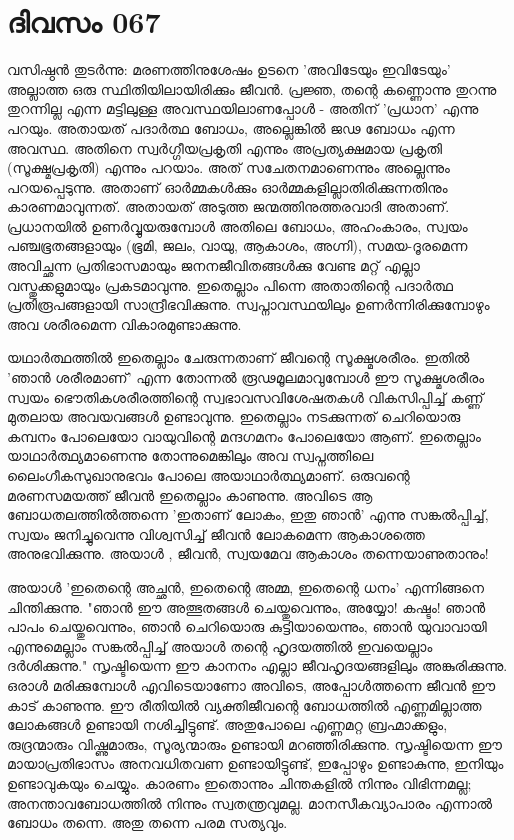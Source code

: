  
\section{ദിവസം 067}


വസിഷ്ഠന്‍ തുടര്‍ന്നു: മരണത്തിനുശേഷം  ഉടനെ 'അവിടേയും ഇവിടേയും' അല്ലാത്ത ഒരു സ്ഥിതിയിലായിരിക്കും ജീവൻ. പ്രജ്ഞ, തന്റെ കണ്ണൊന്നു തുറന്നു തുറന്നില്ല എന്ന മട്ടിലുള്ള അവസ്ഥയിലാണപ്പോള്‍ - അതിന്‌ 'പ്രധാന' എന്നു പറയും. അതായത്‌ പദാര്‍ത്ഥ ബോധം, അല്ലെങ്കിൽ ജഢ ബോധം എന്ന അവസ്ഥ. അതിനെ സ്വര്‍ഗ്ഗീയപ്രകൃതി എന്നും അപ്രത്യക്ഷമായ പ്രകൃതി (സൂക്ഷ്മപ്രകൃതി) എന്നും പറയാം. അത്‌ സചേതനമാണെന്നും അല്ലെന്നും പറയപ്പെടുന്നു. അതാണ്‌ ഓര്‍മ്മകള്‍ക്കും ഓര്‍മ്മകളില്ലാതിരിക്കുന്നതിനും കാരണമാവുന്നത്‌. അതായത്‌ അടുത്ത ജന്മത്തിനുത്തരവാദി അതാണ്‌. പ്രധാനയില്‍ ഉണര്‍വ്വുയരുമ്പോള്‍ അതിലെ ബോധം, അഹംകാരം, സ്വയം പഞ്ചഭൂതങ്ങളായും (ഭൂമി, ജലം, വായു, ആകാശം, അഗ്നി), സമയ-ദൂരമെന്ന അവിച്ഛന്ന പ്രതിഭാസമായും ജനനജീവിതങ്ങള്‍ക്കു വേണ്ട മറ്റ് എല്ലാ വസ്തുക്കളുമായും പ്രകടമാവുന്നു. ഇതെല്ലാം പിന്നെ അതാതിന്റെ പദാര്‍ത്ഥ പ്രതിരൂപങ്ങളായി സാന്ദ്രീഭവിക്കുന്നു. സ്വപ്നാവസ്ഥയിലും ഉണര്‍ന്നിരിക്കുമ്പോഴും അവ ശരീരമെന്ന വികാരമുണ്ടാക്കുന്നു.

യഥാര്‍ത്ഥത്തില്‍ ഇതെല്ലാം ചേരുന്നതാണ്‌ ജീവന്റെ സൂക്ഷ്മശരീരം. ഇതില്‍ 'ഞാന്‍ ശരീരമാണ്‌' എന്ന തോന്നല്‍ രൂഢമൂലമാവുമ്പോള്‍ ഈ സൂക്ഷ്മശരീരം സ്വയം ഭൌതികശരീരത്തിന്റെ സ്വഭാവസവിശേഷതകള്‍ വികസിപ്പിച്ച്‌ കണ്ണ്‌  മുതലായ അവയവങ്ങള്‍ ഉണ്ടാവുന്നു. ഇതെല്ലാം നടക്കുന്നത്‌ ചെറിയൊരു കമ്പനം പോലെയോ വായുവിന്റെ മന്ദഗമനം പോലെയോ ആണ്‌. ഇതെല്ലാം യാഥാര്‍ത്ഥ്യമാണെന്നു തോന്നുമെങ്കിലും അവ സ്വപ്നത്തിലെ ലൈംഗീകസുഖാനുഭവം പോലെ അയാഥാര്‍ത്ഥ്യമാണ്‌. ഒരുവന്റെ മരണസമയത്ത്‌ ജീവന്‍ ഇതെല്ലാം കാണുന്നു. അവിടെ ആ ബോധതലത്തില്‍ത്തന്നെ 'ഇതാണ്‌ ലോകം, ഇതു ഞാന്‍' എന്നു സങ്കല്‍പ്പിച്ച്‌, സ്വയം ജനിച്ചുവെന്നു വിശ്വസിച്ച്‌ ജീവന്‍ ലോകമെന്ന ആകാശത്തെ അനുഭവിക്കുന്നു. അയാള്‍ , ജീവന്‍, സ്വയമേവ ആകാശം തന്നെയാണുതാനും! 

അയാള്‍ 'ഇതെന്റെ അച്ഛന്‍, ഇതെന്റെ അമ്മ, ഇതെന്റെ ധനം' എന്നിങ്ങനെ ചിന്തിക്കുന്നു. "ഞാന്‍ ഈ അത്ഭുതങ്ങള്‍ ചെയ്തുവെന്നും, അയ്യോ! കഷ്ടം! ഞാന്‍ പാപം ചെയ്തുവെന്നും, ഞാന്‍ ചെറിയൊരു കുട്ടിയായെന്നും, ഞാന്‍ യുവാവായി എന്നുമെല്ലാം സങ്കല്‍പ്പിച്ച്‌ അയാള്‍ തന്റെ ഹൃദയത്തില്‍ ഇവയെല്ലാം ദര്‍ശിക്കുന്നു." സൃഷ്ടിയെന്ന ഈ കാനനം എല്ലാ ജീവഹൃദയങ്ങളിലും അങ്കുരിക്കുന്നു. ഒരാള്‍ മരിക്കുമ്പോള്‍ എവിടെയാണോ അവിടെ, അപ്പോള്‍ത്തന്നെ ജീവന്‍ ഈ കാട്‌ കാണുന്നു. ഈ രീതിയില്‍ വ്യക്തിജീവന്റെ ബോധത്തില്‍ എണ്ണമില്ലാത്ത ലോകങ്ങള്‍ ഉണ്ടായി നശിച്ചിട്ടുണ്ട്‌. അതുപോലെ എണ്ണമറ്റ ബ്രഹ്മാക്കളും, രുദ്രന്മാരും വിഷ്ണുമാരും, സൂര്യന്മാരും ഉണ്ടായി മറഞ്ഞിരിക്കുന്നു. സൃഷ്ടിയെന്ന ഈ മായാപ്രതിഭാസം അനവധിതവണ ഉണ്ടായിട്ടുണ്ട്‌, ഇപ്പോഴും ഉണ്ടാകുന്നു, ഇനിയും ഉണ്ടാവുകയും ചെയ്യും. കാരണം ഇതൊന്നും ചിന്തകളില്‍ നിന്നും വിഭിന്നമല്ല; അനന്താവബോധത്തില്‍ നിന്നും സ്വതന്ത്രവുമല്ല. മാനസീകവ്യാപാരം എന്നാല്‍ ബോധം തന്നെ. അതു തന്നെ പരമ സത്യവും.

